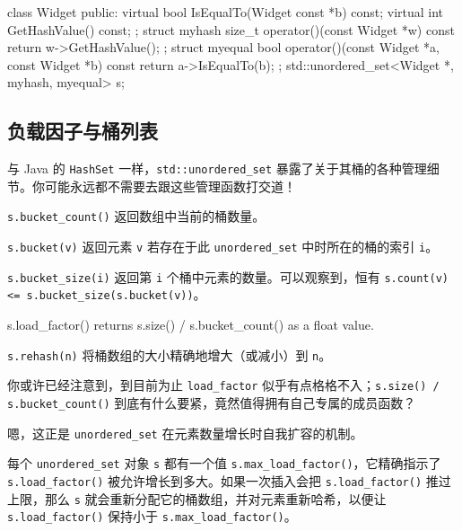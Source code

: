 \begin{codebox}[cpp]
    class Widget {
    public:
      virtual bool IsEqualTo(Widget const *b) const;
      virtual int GetHashValue() const;
    };
    struct myhash {
      size_t operator()(const Widget *w) const {
        return w->GetHashValue();
      }
    };
    struct myequal {
      bool operator()(const Widget *a, const Widget *b) const {
        return a->IsEqualTo(b);
      }
    };
    std::unordered_set<Widget *, myhash, myequal> s;
\end{codebox}

\subsection{负载因子与桶列表}

与 Java 的 \texttt{Hash\allowbreak{}Set} 一样，\texttt{std::\allowbreak{}unordered\_\allowbreak{}set} 暴露了关于其桶的各种管理细节。你可能永远都不需要去跟这些管理函数打交道！

\texttt{s.\allowbreak{}bucket\_\allowbreak{}count(\allowbreak{})\allowbreak{}} 返回数组中当前的桶数量。

\texttt{s.\allowbreak{}bucket(\allowbreak{}v)\allowbreak{}} 返回元素 \texttt{v} 若存在于此 \texttt{unordered\_\allowbreak{}set} 中时所在的桶的索引 \texttt{i}。

\texttt{s.\allowbreak{}bucket\_\allowbreak{}size(\allowbreak{}i)\allowbreak{}} 返回第 \texttt{i} 个桶中元素的数量。可以观察到，恒有 \texttt{s.\allowbreak{}count(\allowbreak{}v)\allowbreak{} <= s.\allowbreak{}bucket\_\allowbreak{}size(\allowbreak{}s.\allowbreak{}bucket(\allowbreak{}v)\allowbreak{})\allowbreak{}}。

\begin{codebox}[cpp]
s.load_factor() returns s.size() / s.bucket_count() as a float value.
\end{codebox}

\texttt{s.\allowbreak{}rehash(\allowbreak{}n)\allowbreak{}} 将桶数组的大小精确地增大（或减小）到 \texttt{n}。

你或许已经注意到，到目前为止 \texttt{load\_\allowbreak{}factor} 似乎有点格格不入；\texttt{s.\allowbreak{}size(\allowbreak{})\allowbreak{} /\allowbreak{} s.\allowbreak{}bucket\_\allowbreak{}count(\allowbreak{})\allowbreak{}} 到底有什么要紧，竟然值得拥有自己专属的成员函数？

嗯，这正是 \texttt{unordered\_\allowbreak{}set} 在元素数量增长时自我扩容的机制。

每个 \texttt{unordered\_\allowbreak{}set} 对象 \texttt{s} 都有一个值 \texttt{s.\allowbreak{}max\_\allowbreak{}load\_\allowbreak{}factor(\allowbreak{})\allowbreak{}}，它精确指示了 \texttt{s.\allowbreak{}load\_\allowbreak{}factor(\allowbreak{})\allowbreak{}} 被允许增长到多大。如果一次插入会把 \texttt{s.\allowbreak{}load\_\allowbreak{}factor(\allowbreak{})\allowbreak{}} 推过上限，那么 \texttt{s} 就会重新分配它的桶数组，并对元素重新哈希，以便让 \texttt{s.\allowbreak{}load\_\allowbreak{}factor(\allowbreak{})\allowbreak{}} 保持小于 \texttt{s.\allowbreak{}max\_\allowbreak{}load\_\allowbreak{}factor(\allowbreak{})\allowbreak{}}。

